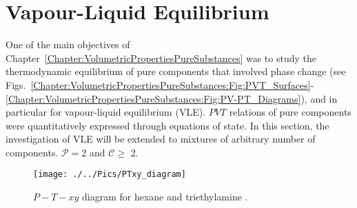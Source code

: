 \section{Vapour-Liquid Equilibrium}\label{Chapter:VLE:Section:VLE}
One of the main objectives of Chapter~\ref{Chapter:VolumetricPropertiesPureSubstances} was to study the thermodynamic equilibrium of pure components that involved phase change (see Figs.~\ref{Chapter:VolumetricPropertiesPureSubstances:Fig:PVT_Surfaces}-\ref{Chapter:VolumetricPropertiesPureSubstances:Fig:PV-PT_Diagrams}), and in particular for vapour-liquid equilibrium (VLE). $PVT$ relations of pure components were quantitatively expressed through equations of state. In this section, the investigation of VLE will be extended to mixtures of arbitrary number of components. \ie $\mathcal{P}=$2 and $\mathcal{C}\ge$ 2.
      \begin{figure}[h]
         \begin{center}
           \texttt{[image: ./../Pics/PTxy\_diagram]}
           \vspace{-.1cm}\caption{$P-T-xy$ diagram for hexane and triethylamine \citep[extracted from][]{Sandler_Book}.}\label{Chapter:VLE:Fig:Fig01}
         \end{center}
       \end{figure}

